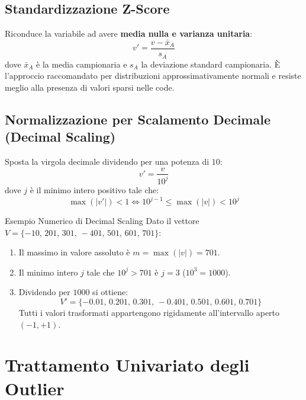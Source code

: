 \subsection{Standardizzazione Z-Score}
Riconduce la variabile ad avere \textbf{media nulla e varianza unitaria}:
\begin{equation}
    v' = \frac{v - \bar{x}_A}{s_A}
\end{equation}
dove $\bar{x}_A$ è la media campionaria e $s_A$ la deviazione standard campionaria. È l'approccio raccomandato per distribuzioni approssimativamente normali e resiste meglio alla presenza di valori sparsi nelle code.

\subsection{Normalizzazione per Scalamento Decimale (Decimal Scaling)}
Sposta la virgola decimale dividendo per una potenza di $10$:
\begin{equation}
    v' = \frac{v}{10^j}
\end{equation}
dove $j$ è il minimo intero positivo tale che:
\begin{equation}
    \max(|v'|) < 1 \iff 10^{j-1} \le \max(|v|) < 10^j
\end{equation}

\begin{noteblock}{Esempio Numerico di Decimal Scaling}
Dato il vettore $V = \{-10,\, 201,\, 301,\, -401,\, 501,\, 601,\, 701\}$:
\begin{enumerate}
    \item Il massimo in valore assoluto è $m = \max(|v|) = 701$.
    \item Il minimo intero $j$ tale che $10^j > 701$ è $j=3$ ($10^3 = 1000$).
    \item Dividendo per $1000$ si ottiene:
    \begin{equation}
        V' = \{-0.01,\, 0.201,\, 0.301,\, -0.401,\, 0.501,\, 0.601,\, 0.701\}
    \end{equation}
    Tutti i valori trasformati appartengono rigidamente all'intervallo aperto $(-1, +1)$.
\end{enumerate}
\end{noteblock}

\section{Trattamento Univariato degli Outlier}
\label{sec:dm-univariate-outlier-treatment}

